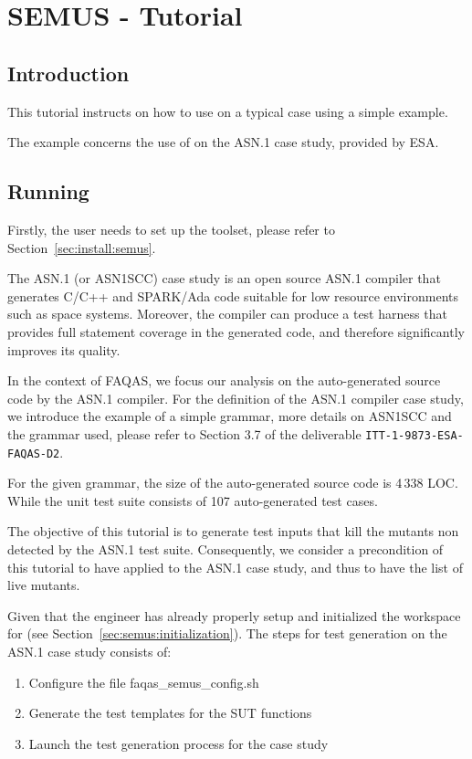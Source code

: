 
\chapter{SEMUS - Tutorial}
\label{chapter:semus:tutorial}

\section{Introduction}

This tutorial instructs on how to use \SEMUS on a typical case using a simple example. 

The example concerns the use of \SEMUS on the ASN.1 case study, provided by ESA.

\section{Running \SEMUS}
\label{sec:semus_running}

Firstly, the user needs to set up the \SEMUS toolset, please refer to Section~\ref{sec:install:semus}.

The ASN.1 (or ASN1SCC) case study is an open source ASN.1 compiler that generates C/C++ and SPARK/Ada code suitable for low resource environments such as space systems. Moreover, the compiler can produce a test harness that provides full statement coverage in the generated code, and therefore significantly improves its quality.

In the context of FAQAS, we focus our analysis on the auto-generated source code by the ASN.1 compiler. For the definition of the ASN.1 compiler case study, we introduce the example of a simple grammar, more details on ASN1SCC and the grammar used, please refer to Section 3.7 of the deliverable \texttt{ITT-1-9873-ESA-FAQAS-D2}.

For the given grammar, the size of the auto-generated source code is 4\,338 LOC. While the unit test suite consists of 107 auto-generated test cases.

The objective of this tutorial is to generate test inputs that kill the mutants non detected by the ASN.1 test suite. Consequently, we consider a precondition of this tutorial to have applied \MASS to the ASN.1 case study, and thus to have the list of live mutants.

Given that the engineer has already properly setup and initialized the workspace for \SEMUS (see Section~\ref{sec:semus:initialization}). The steps for test generation on the ASN.1 case study consists of:

\begin{enumerate}
    \item Configure the file faqas\_semus\_config.sh
    \item Generate the test templates for the SUT functions
    \item Launch the test generation process for the case study
\end{enumerate}



